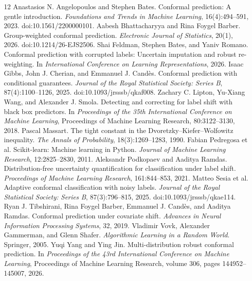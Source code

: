 \documentclass[twoside,11pt]{article}
\begin{document}

\begin{thebibliography}{12}
 Anastasios N. Angelopoulos and Stephen Bates. Conformal prediction: A gentle introduction. \emph{Foundations and Trends in Machine Learning}, 16(4):494--591, 2023. doi:10.1561/2200000101.
 Aabesh Bhattacharyya and Rina Foygel Barber. Group-weighted conformal prediction. \emph{Electronic Journal of Statistics}, 20(1), 2026. doi:10.1214/26-EJS2506.
 Shai Feldman, Stephen Bates, and Yaniv Romano. Conformal prediction with corrupted labels: Uncertain imputation and robust re-weighting. In \emph{International Conference on Learning Representations}, 2026.
 Isaac Gibbs, John J. Cherian, and Emmanuel J. Cand\`es. Conformal prediction with conditional guarantees. \emph{Journal of the Royal Statistical Society: Series B}, 87(4):1100--1126, 2025. doi:10.1093/jrsssb/qkaf008.
 Zachary C. Lipton, Yu-Xiang Wang, and Alexander J. Smola. Detecting and correcting for label shift with black box predictors. In \emph{Proceedings of the 35th International Conference on Machine Learning}, Proceedings of Machine Learning Research, 80:3122--3130, 2018.
 Pascal Massart. The tight constant in the Dvoretzky--Kiefer--Wolfowitz inequality. \emph{The Annals of Probability}, 18(3):1269--1283, 1990.
 Fabian Pedregosa et al. Scikit-learn: Machine learning in Python. \emph{Journal of Machine Learning Research}, 12:2825--2830, 2011.
 Aleksandr Podkopaev and Aaditya Ramdas. Distribution-free uncertainty quantification for classification under label shift. \emph{Proceedings of Machine Learning Research}, 161:844--853, 2021.
 Matteo Sesia et al. Adaptive conformal classification with noisy labels. \emph{Journal of the Royal Statistical Society: Series B}, 87(3):796--815, 2025. doi:10.1093/jrsssb/qkae114.
 Ryan J. Tibshirani, Rina Foygel Barber, Emmanuel J. Cand\`es, and Aaditya Ramdas. Conformal prediction under covariate shift. \emph{Advances in Neural Information Processing Systems}, 32, 2019.
 Vladimir Vovk, Alexander Gammerman, and Glenn Shafer. \emph{Algorithmic Learning in a Random World}. Springer, 2005.
 Yuqi Yang and Ying Jin. Multi-distribution robust conformal prediction. In \emph{Proceedings of the 43rd International Conference on Machine Learning}, Proceedings of Machine Learning Research, volume 306, pages 144952--145007, 2026.
\end{thebibliography}
\end{document}
